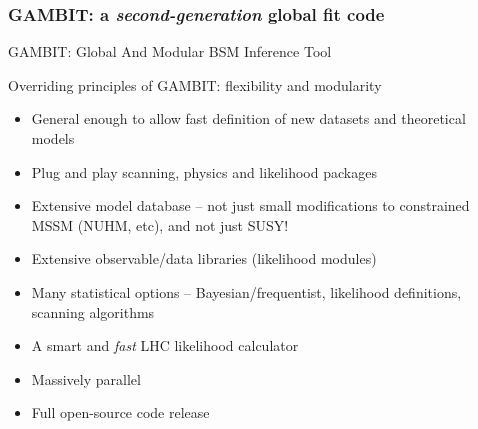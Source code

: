 \documentclass[xcolor=dvipsnames]{beamer}
\begin{document}
\begin{frame}
\frametitle{\textbf{GAMBIT}: a \textit{second-generation} global fit code}

GAMBIT: \alert{G}lobal \alert{A}nd \alert{M}odular \alert{B}SM \alert{I}nference \alert{T}ool
\vspace{5mm}

Overriding principles of GAMBIT: flexibility and modularity
\begin{itemize}
\item General enough to allow fast definition of new datasets and theoretical models
\item Plug and play scanning, physics and likelihood packages
\item Extensive model database -- not just small modifications to constrained MSSM (NUHM, etc), and not just SUSY!
\item Extensive observable/data libraries (likelihood modules)
\item Many statistical options -- Bayesian/frequentist, likelihood definitions, scanning algorithms
\item A smart and \textit{fast} LHC likelihood calculator
\item Massively parallel
\item Full open-source code release
\end{itemize}

\end{frame}
\end{document}
